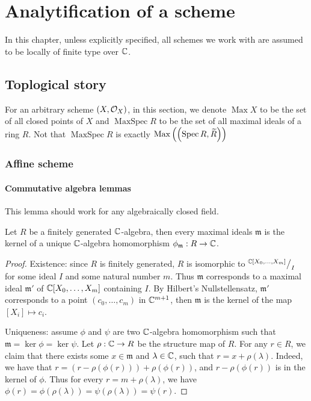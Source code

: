 \chapter{Analytification of a scheme}

In this chapter, unless explicitly specified, all schemes we work with are assumed to be locally of finite type over $\mathbb{C}$.

\section{Toplogical story}

For an arbitrary scheme $\left(X, \mathcal{O}_{X}\right)$, in this section, we denote $\operatorname{Max}{X}$ to be the set of all closed points of $X$ and $\operatorname{MaxSpec} R$ to be the set of all maximal ideals of a ring $R$. Not that $\operatorname{MaxSpec} R$ is exactly $\operatorname{Max}\left(\left(\operatorname*{Spec}{R}, \widetilde{R}\right)\right)$

\subsection{Affine scheme}

\subsubsection{Commutative algebra lemmas}

This lemma should work for any algebraically closed field.
\begin{lemma}
  \label{lemma:maximal-ideals-of-fg-algebra}
  Let $R$ be a finitely generated $\mathbb{C}$-algebra, then every maximal ideals $\mathfrak{m}$ is the kernel of a unique $\mathbb{C}$-algebra homomorphism $\phi_{\mathfrak{m}}: R \to \mathbb{C}$.
\end{lemma}

\begin{proof}
  Existence: since $R$ is finitely generated, $R$ is isomorphic to $^{\mathbb{C}[X_{0}, \dots, X_{m}]}\big/_{I}$ for some ideal $I$ and some natural number $m$. Thus $\mathfrak{m}$ corresponds to a maximal ideal $\mathfrak{m}'$ of $\mathbb{C}[X_{0}, \dots, X_{m}]$ containing $I$. By Hilbert's Nullstellensatz, $\mathfrak{m}'$ corresponds to a point $(c_{0},\dots, c_{m})$ in $\mathbb{C}^{m+1}$, then $\mathfrak{m}$ is the kernel of the map $[X_{i}] \mapsto c_{i}$.

  Uniqueness: assume $\phi$ and $\psi$ are two $\mathbb{C}$-algebra homomorphism such that $\mathfrak{m}=\ker \phi = \ker \psi$.
  Let $\rho : \mathbb{C} \to R$ be the structure map of $R$.
  For any $r \in R$, we claim that there exists some $x \in \mathfrak m$ and $\lambda \in \mathbb{C}$, such that $r = x + \rho(\lambda)$. Indeed, we have that $r = (r - \rho(\phi(r))) + \rho(\phi(r))$, and $r - \rho(\phi(r))$ is in the kernel of $\phi$. Thus for every $r = m + \rho(\lambda)$, we have $\phi(r) = \phi(\rho(\lambda)) = \psi(\rho(\lambda)) = \psi(r)$.

\end{proof}
